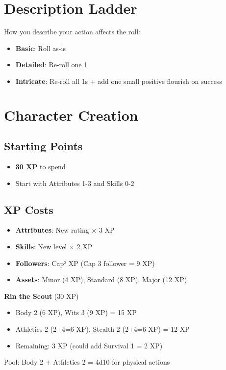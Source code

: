 \documentclass[11pt]{article}
\begin{document}
\section{Description Ladder}

How you describe your action affects the roll:

\begin{itemize}
    \item \textbf{Basic}: Roll as-is
    \item \textbf{Detailed}: Re-roll one 1
    \item \textbf{Intricate}: Re-roll all 1s + add one small positive flourish on success
\end{itemize}

\section{Character Creation}

\subsection{Starting Points}
\begin{itemize}
    \item \textbf{30 XP} to spend
    \item Start with Attributes 1-3 and Skills 0-2
\end{itemize}

\subsection{XP Costs}
\begin{itemize}
    \item \textbf{Attributes}: New rating × 3 XP
    \item \textbf{Skills}: New level × 2 XP
    \item \textbf{Followers}: Cap² XP (Cap 3 follower = 9 XP)
    \item \textbf{Assets}: Minor (4 XP), Standard (8 XP), Major (12 XP)
\end{itemize}

\begin{examplebox}
\textbf{Rin the Scout} (30 XP)
\begin{itemize}
    \item Body 2 (6 XP), Wits 3 (9 XP) = 15 XP
    \item Athletics 2 (2+4=6 XP), Stealth 2 (2+4=6 XP) = 12 XP
    \item Remaining: 3 XP (could add Survival 1 = 2 XP)
\end{itemize}
Pool: Body 2 + Athletics 2 = 4d10 for physical actions
\end{examplebox}
\end{document}
